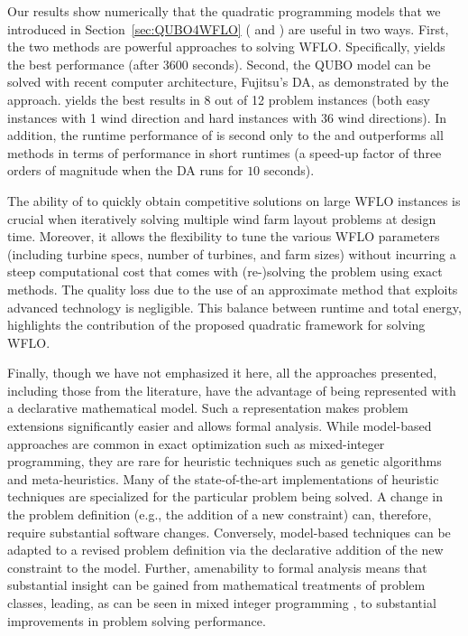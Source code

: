 \documentclass[preprint,12pt]{elsarticle}
\newcommand{\qcls}{{\sf {\small QC-LS\xspace}}}
\newcommand{\quls}{{\sf {\small QU-LS\xspace}}}
\newcommand{\qclsgrb}{{\sf {\small QC-LS(GRB)\xspace}}}
\newcommand{\qulsda}{{\sf {\small QU-LS(DA)\xspace}}}
\begin{document}
Our results show numerically that the quadratic programming models that we
introduced in Section~\ref{sec:QUBO4WFLO} (\qcls{} and \quls{}) are useful in two ways.
First, the two methods are powerful approaches to solving WFLO. Specifically, \qcls{} yields the best performance (after 3600 seconds). Second, the QUBO model can be solved with recent computer architecture, Fujitsu's DA, as demonstrated by the \qulsda{} approach. \qulsda{} yields the best results in 8 out of 12 problem instances (both easy instances with 1 wind direction and hard instances with 36 wind directions). 
In addition, the runtime performance of \qulsda{} is second
only to the \qclsgrb{} and outperforms all methods in terms of performance in short runtimes (a speed-up factor of three orders of magnitude when the DA runs for $10$ seconds).



The ability of \qulsda{} to quickly obtain competitive solutions on large WFLO instances 
is crucial when iteratively solving
multiple wind farm layout problems at design time. Moreover, it allows the flexibility to tune the various WFLO parameters (including turbine specs, number of turbines, and farm sizes) without incurring a steep computational cost that comes
with (re-)solving the problem using exact methods. The quality loss due to the use of an approximate method 
that exploits advanced technology is negligible. This balance between
runtime and total energy, highlights the contribution of the proposed quadratic framework for solving WFLO. 

Finally, though we have not emphasized it here, all the approaches presented, including those from the literature, have the advantage of being represented with a declarative mathematical model. Such a representation makes problem extensions significantly easier and allows formal analysis. While model-based  approaches are common in exact optimization such as mixed-integer programming, they are rare for heuristic techniques such as genetic algorithms and meta-heuristics. Many of the state-of-the-art implementations of heuristic techniques are specialized for the particular problem being solved. A change in the problem definition (e.g., the addition of a new constraint) can, therefore, require substantial software changes. Conversely, model-based techniques can be adapted to a revised problem definition via the declarative addition of the new constraint to the model. Further, amenability to formal analysis means that substantial insight can be gained from mathematical treatments of problem classes, leading, as can be seen in mixed integer programming \cite{Bixby07a}, to substantial improvements in problem solving performance.
\end{document}
